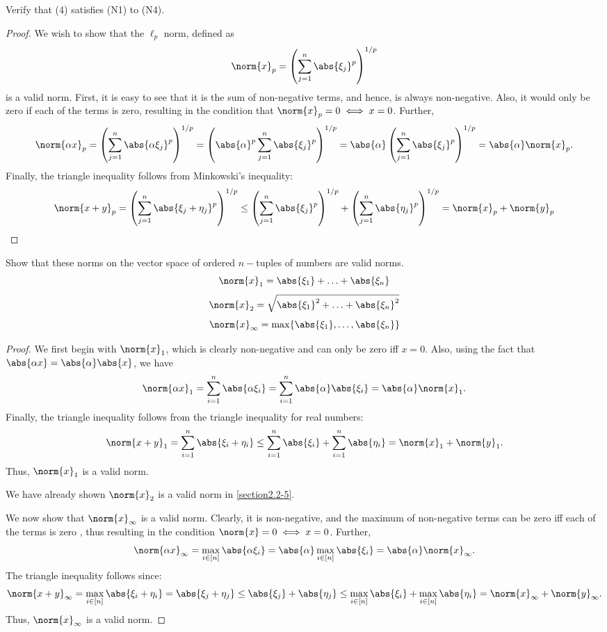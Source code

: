 \begin{question}
    Verify that (4) satisfies (N1) to (N4).
    \label{section2.2-7}
\end{question}
\begin{proof}
    We wish to show that the $\ell_p$ norm, defined as 
    \[\norm{x}_p = \left(\sum_{j=1}^n \abs{\xi_j}^p \right)^{1/p}\]
    is a valid norm. First, it is easy to see that it is the sum of non-negative terms, and hence, is always non-negative. Also, it would only be zero if each of the terms is zero, resulting in the condition that $\norm{x}_p = 0 \iff x = 0$. Further,
    \[\norm{\alpha x}_p = \left(\sum_{j=1}^n \abs{\alpha \xi_j}^p \right)^{1/p} = \left(\abs{\alpha}^p\sum_{j=1}^n \abs{\xi_j}^p \right)^{1/p} = \abs{\alpha} \left(\sum_{j=1}^n \abs{\xi_j}^p \right)^{1/p} = \abs{\alpha} \norm{x}_p.\]
    Finally, the triangle inequality follows from Minkowski's inequality:
    \begin{align*}
        \norm{x + y}_p = \left(\sum_{j=1}^n \abs{\xi_j + \eta_j}^p \right)^{1/p} \leq \left(\sum_{j=1}^n \abs{\xi_j}^p \right)^{1/p} + \left(\sum_{j=1}^n \abs{\eta_j}^p \right)^{1/p} = \norm{x}_p + \norm{y}_p
    \end{align*}
\end{proof}


\begin{question}
    Show that these norms on the vector space of ordered $n-$tuples of numbers are valid norms.
    \[\norm{x}_1 = \abs{\xi_1} + \ldots + \abs{\xi_n}\]
    \[\norm{x}_2 = \sqrt{\abs{\xi_1}^2 + \ldots + \abs{\xi_n}^2}\]
    \[\norm{x}_\infty = \max\{\abs{\xi_1} , \ldots , \abs{\xi_n}\}\]
    \label{section2.2-8}
\end{question}
\begin{proof}
    We first begin with $\norm{x}_1$, which is clearly non-negative and can only be zero iff $x  = 0$. Also, using the fact that $\abs{\alpha x} = \abs{\alpha}\abs{x}$, we have
    \[\norm{\alpha x}_1 = \sum_{i=1}^n \abs{\alpha \xi_i} = \sum_{i=1}^n \abs{\alpha}\abs{\xi_i} = \abs{\alpha}\norm{x}_1.\]
    Finally, the triangle inequality follows from the triangle inequality for real numbers:
    \[\norm{x + y}_1 = \sum_{i=1}^n \abs{\xi_i + \eta_i} \leq \sum_{i=1}^n \abs{\xi_i} + \sum_{i=1}^n\abs{\eta_i} = \norm{x}_1 + \norm{y}_1.\]
    Thus, $\norm{x}_1$ is a valid norm.

    We have already shown $\norm{x}_2$ is a valid norm in \ref{section2.2-5}.

    We now show that $\norm{x}_\infty$ is a valid norm. Clearly, it is non-negative, and the maximum of non-negative terms can be zero iff each of the terms is zero , thus resulting in the condition $\norm{x} = 0 \iff x = 0$. Further,
    \[\norm{\alpha x}_\infty = \max_{i \in [n]} \abs{\alpha \xi_i} = \abs{\alpha} \max_{i \in [n]} \abs{\xi_i} = \abs{\alpha} \norm{x}_\infty.\]
    The triangle inequality follows since:
    \[\norm{x + y}_\infty = \max_{i \in [n]} \abs{\xi_i + \eta_i} = \abs{\xi_j + \eta_j} \leq \abs{\xi_j} + \abs{\eta_j} \leq \max_{i \in [n]} \abs{\xi_i} + \max_{i \in [n]} \abs{\eta_i} = \norm{x}_\infty + \norm{y}_\infty.\]
    Thus, $\norm{x}_\infty$ is a valid norm.
\end{proof}


